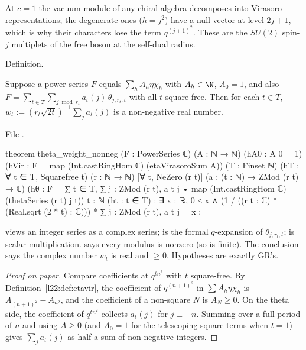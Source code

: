 \begin{physics}
At $c=1$ the vacuum module of any chiral algebra decomposes into Virasoro representations; the degenerate ones
($h=j^2$) have a null vector at level $2j+1$, which is why their characters lose the term $q^{(j+1)^2}$. These are
the $SU(2)$ spin-$j$ multiplets of the free boson at the self-dual radius.
\end{physics}

\begin{status}
Definition.
\end{status}

\begin{theorem}\label{l22:thm:wnonneg}
Suppose a power series $F$ equals $\sum_hA_h\eta\chi_h$ with $A_h\in\N$, $A_0=1$, and also
$F=\sum_{t\in T}\sum_{j\bmod r_t}a_t(j)\,\theta_{j,r_t,t}$ with all $t$ square-free. Then for each $t\in T$,
$w_t:=(r_t\sqrt{2t})^{-1}\sum_ja_t(j)$ is a non-negative real number.
\end{theorem}
\noindent File .
\begin{leancode}
theorem theta_weight_nonneg (F : PowerSeries ℂ) (A : ℕ → ℕ) (hA0 : A 0 = 1)
    (hVir : F = map (Int.castRingHom ℂ) (etaVirasoroSum A))
    (T : Finset ℕ) (hT : ∀ t ∈ T, Squarefree t) (r : ℕ → ℕ) [∀ t, NeZero (r t)]
    (a : (t : ℕ) → ZMod (r t) → ℂ)
    (hθ : F = ∑ t ∈ T, ∑ j : ZMod (r t), a t j • map (Int.castRingHom ℂ) (thetaSeries (r t) j t))
    {t : ℕ} (ht : t ∈ T) :
    ∃ x : ℝ, 0 ≤ x ∧
      (1 / ((r t : ℂ) * (Real.sqrt (2 * t) : ℂ))) * ∑ j : ZMod (r t), a t j = x :=
\end{leancode}

\begin{dictionary}
 views an integer series as a complex series;  is the
formal $q$-expansion of $\theta_{j,r_t,t}$;  is scalar multiplication. \lean{[∀ t, NeZero (r t)]}
says every modulus is nonzero (so  is finite). The conclusion 
says the complex number $w_t$ is real and $\ge0$. Hypotheses are exactly GR's.
\end{dictionary}

\begin{proof}[Proof on paper]
Compare coefficients at $q^{tn^2}$ with $t$ square-free. By Definition~\ref{l22:def:etavir}, the coefficient of
$q^{(n+1)^2}$ in $\sum A_h\eta\chi_h$ is $A_{(n+1)^2}-A_{n^2}$, and the coefficient of a non-square $N$ is $A_N\ge0$.
On the theta side, the coefficient of $q^{tn^2}$ collects $a_t(j)$ for $j\equiv\pm n$. Summing over a full period
of $n$ and using $A\ge0$ (and $A_0=1$ for the telescoping square terms when $t=1$) gives
$\sum_ja_t(j)$ as half a sum of non-negative integers.
\end{proof}

